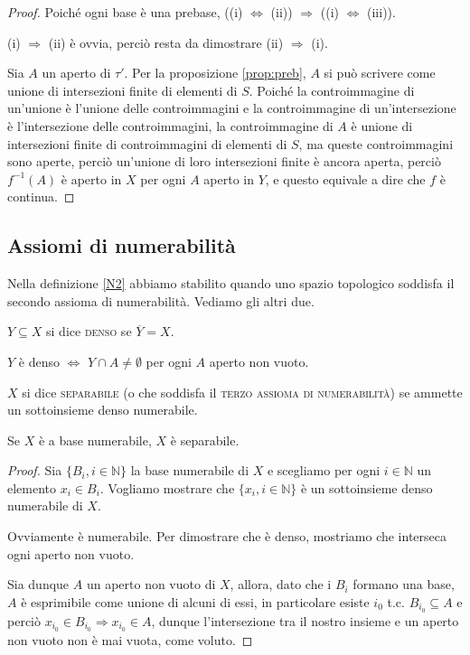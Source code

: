 \documentclass{article}
\begin{document}
\begin{proof}
	Poiché ogni base è una prebase, ((i) $\Leftrightarrow$ (ii)) $\Rightarrow$
	((i) $\Leftrightarrow$ (iii)).

	(i) $\Rightarrow$ (ii) è ovvia, perciò resta da dimostrare (ii)
	$\Rightarrow$ (i).

	Sia $A$ un aperto di $\tau'$. Per la proposizione \ref{prop:preb}, $A$ si
	può scrivere come unione di intersezioni finite di elementi di $S$. Poiché
	la controimmagine di un'unione è l'unione delle controimmagini e la
	controimmagine di un'intersezione è l'intersezione delle controimmagini, la
	controimmagine di $A$ è unione di intersezioni finite di controimmagini di
	elementi di $S$, ma queste controimmagini sono aperte, perciò un'unione di
	loro intersezioni finite è ancora aperta, perciò $f^{-1}(A)$ è aperto in $X$
	per ogni $A$ aperto in $Y$, e questo equivale a dire che $f$ è continua.
\end{proof}

\subsection{Assiomi di numerabilità}

Nella definizione \ref{N2} abbiamo stabilito quando uno spazio topologico
soddisfa il secondo assioma di numerabilità. Vediamo gli altri due.

\begin{defn}
	$Y \subseteq X$ si dice \textsc{denso} se $\overline{Y}=X$.
\end{defn}

\begin{oss}
	$Y$ è denso $\Leftrightarrow$ $Y \cap A \not=\emptyset$ per ogni $A$ aperto
	non vuoto.
\end{oss}

\begin{defn} \label{N3}
	$X$ si dice \textsc{separabile} (o che soddisfa il \textsc{terzo assioma di
	numerabilità}) se ammette un sottoinsieme denso numerabile.
\end{defn}

\begin{prop} \label{N2impN3}
	Se $X$ è a base numerabile, $X$ è separabile.
\end{prop}

\begin{proof}
	Sia $\{ B_i, {i \in \mathbb{N}}\}$ la base numerabile di $X$ e scegliamo per
	ogni $i \in \mathbb{N}$ un elemento $x_i \in B_i$. Vogliamo mostrare che $\{
	x_i, i \in \mathbb{N} \}$ è un sottoinsieme denso numerabile di $X$.

	Ovviamente è numerabile. Per dimostrare che è denso, mostriamo che interseca
	ogni aperto non vuoto.

	Sia dunque $A$ un aperto non vuoto di $X$, allora, dato che i $B_i$ formano
	una base, $A$ è esprimibile come unione di alcuni di essi, in particolare
	esiste $i_0$ t.c. $B_{i_0} \subseteq A$ e perciò $x_{i_0} \in B_{i_0}
	\Rightarrow x_{i_0} \in A$, dunque l'intersezione tra il nostro insieme e un
	aperto non vuoto non è mai vuota, come voluto.
\end{proof}
\end{document}
